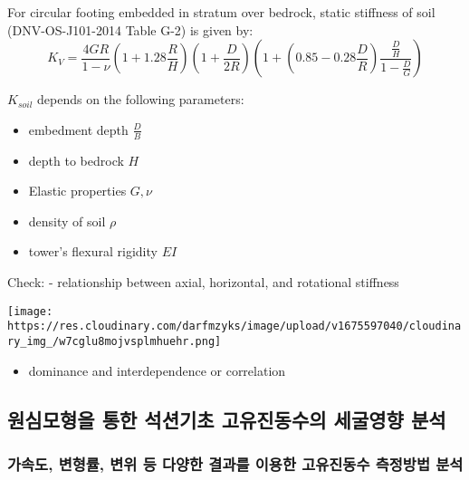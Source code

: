 \documentclass[
  letterpaper,
  DIV=11,
  numbers=noendperiod]{scrreprt}
\providecommand{\tightlist}{%
  \setlength{\itemsep}{0pt}\setlength{\parskip}{0pt}}\usepackage{longtable,booktabs,array}
\begin{document}
For circular footing embedded in stratum over bedrock, static stiffness
of soil (DNV-OS-J101-2014 Table G-2) is given by: \[
K_V = \frac{4GR}{1-\nu} (1+ 1.28 \frac{R}{H}) (1+ \frac{D}{2R}) (1+ (0.85  -0.28 \frac{D}{R})\frac{\frac{D}{H}}{1-\frac{D}{G}})
\]

\(K_{soil}\) depends on the following parameters:

\begin{itemize}
\tightlist
\item
  embedment depth \(\frac{D}{B}\)
\item
  depth to bedrock \(H\)
\item
  Elastic properties \(G, \nu\)
\item
  density of soil \(\rho\)
\item
  tower's flexural rigidity \(EI\)
\end{itemize}

Check: - relationship between axial, horizontal, and rotational
stiffness

\texttt{[image: https://res.cloudinary.com/darfmzyks/image/upload/v1675597040/cloudinary\_img\_/w7cglu8mojvsplmhuehr.png]}

\begin{itemize}
\tightlist
\item
  dominance and interdependence or correlation
\end{itemize}

\hypertarget{uxc6d0uxc2ecuxbaa8uxd615uxc744-uxd1b5uxd55c-uxc11duxc158uxae30uxcd08-uxace0uxc720uxc9c4uxb3d9uxc218uxc758-uxc138uxad74uxc601uxd5a5-uxbd84uxc11d}{%
\subsection{원심모형을 통한 석션기초 고유진동수의 세굴영향
분석}\label{uxc6d0uxc2ecuxbaa8uxd615uxc744-uxd1b5uxd55c-uxc11duxc158uxae30uxcd08-uxace0uxc720uxc9c4uxb3d9uxc218uxc758-uxc138uxad74uxc601uxd5a5-uxbd84uxc11d}}

\hypertarget{uxac00uxc18duxb3c4-uxbcc0uxd615uxb960-uxbcc0uxc704-uxb4f1-uxb2e4uxc591uxd55c-uxacb0uxacfcuxb97c-uxc774uxc6a9uxd55c-uxace0uxc720uxc9c4uxb3d9uxc218-uxce21uxc815uxbc29uxbc95-uxbd84uxc11d}{%
\subsubsection{가속도, 변형률, 변위 등 다양한 결과를 이용한 고유진동수
측정방법
분석}\label{uxac00uxc18duxb3c4-uxbcc0uxd615uxb960-uxbcc0uxc704-uxb4f1-uxb2e4uxc591uxd55c-uxacb0uxacfcuxb97c-uxc774uxc6a9uxd55c-uxace0uxc720uxc9c4uxb3d9uxc218-uxce21uxc815uxbc29uxbc95-uxbd84uxc11d}}
\end{document}
